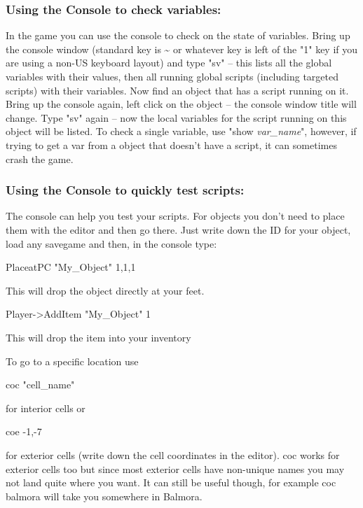 \documentclass[
]{article}
\begin{document}
\hypertarget{using-the-console-to-check-variables}{%
\subsubsection{Using the Console to check
variables:}\label{using-the-console-to-check-variables}}

In the game you can use the console to check on the state of variables.
Bring up the console window (standard key is \textasciitilde{} or
whatever key is left of the "1" key if you are using a non-US keyboard
layout) and type "sv" -- this lists all the global variables with their
values, then all running global scripts (including targeted scripts)
with their variables. Now find an object that has a script running on
it. Bring up the console again, left click on the object -- the console
window title will change. Type "sv" again -- now the local variables for
the script running on this object will be listed. To check a single
variable, use "show \emph{var\_name}", however, if trying to get a var
from a object that doesn't have a script, it can sometimes crash the
game.

\hypertarget{using-the-console-to-quickly-test-scripts}{%
\subsubsection{Using the Console to quickly test
scripts:}\label{using-the-console-to-quickly-test-scripts}}

The console can help you test your scripts. For objects you don't need
to place them with the editor and then go there. Just write down the ID
for your object, load any savegame and then, in the console type:

PlaceatPC "My\_Object" 1,1,1

This will drop the object directly at your feet.

Player-\textgreater AddItem "My\_Object" 1

This will drop the item into your inventory

To go to a specific location use

coc "cell\_name"

for interior cells or

coe -1,-7

for exterior cells (write down the cell coordinates in the editor). coc
works for exterior cells too but since most exterior cells have
non-unique names you may not land quite where you want. It can still be
useful though, for example coc balmora will take you somewhere in
Balmora.
\end{document}
